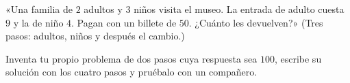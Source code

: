 \begin{exercise}[$\star\star$]\label{exo:g3:problems:10}
«Una familia de $2$ adultos y $3$ niños visita el museo. La entrada de adulto
cuesta $9$ y la de niño $4$. Pagan con un billete de $50$.
¿Cuánto les devuelven?» (Tres pasos: adultos, niños y después
el cambio.)
\end{exercise}

\begin{exercise}[$\star\star$]\label{exo:g3:problems:11}
Inventa tu propio problema de dos pasos cuya respuesta sea $100$, escribe su
solución con los cuatro pasos y pruébalo con un compañero.
\end{exercise}
